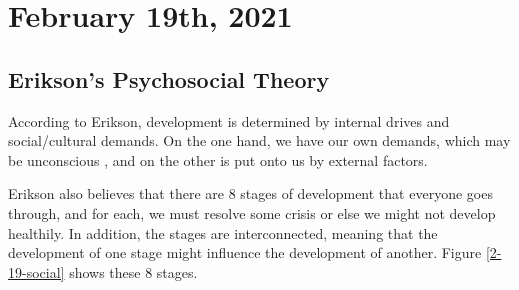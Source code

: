 \documentclass[../main/main.tex]{subfiles}
\begin{document}
\section{February 19th, 2021}
\subsection{Erikson's Psychosocial Theory}
According to Erikson, development is determined by internal drives and social/cultural demands. On the one hand, we have our own demands, which may be unconscious , and on the other is put onto us by external factors.

Erikson also believes that there are 8 stages of development that everyone goes through, and for each, we must resolve some crisis or else we might not develop healthily. In addition, the stages are interconnected, meaning that the development of one stage might influence the development of another. Figure \ref{2-19-social} shows these 8 stages.
\end{document}

